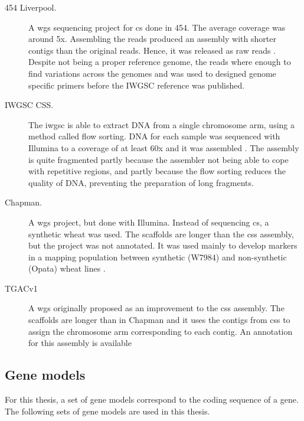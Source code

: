\begin{description}
\item[454 Liverpool.] A \gls{wgs} sequencing project for \gls{cs} done in 454. The average coverage was around 5x. Assembling the reads produced an assembly with shorter contigs than the original reads. Hence, it was released as raw reads \citep{Brenchley2012}. Despite not being a proper reference genome, the reads where enough to find variations across the genomes and was used to designed genome specific primers before the IWGSC reference was published. 
\item[IWGSC CSS.] The \gls{iwgsc} is able to extract DNA from a single chromosome arm, using a method called flow sorting. DNA for each sample was sequenced with Illumina to a coverage of at least 60x and it was assembled \citep{Mayer2014}. The assembly is quite fragmented partly because the assembler not being able to cope with repetitive regions, and partly because the flow sorting reduces the quality of DNA, preventing the preparation of long fragments. 
\item[Chapman.] A \gls{wgs} project, but done with Illumina. Instead of sequencing \gls{cs}, a synthetic wheat was used. The scaffolds are longer than the \gls{css} assembly, but the project was not annotated. It was used mainly to develop markers in a mapping population between synthetic (W7984) and non-synthetic (Opata) wheat lines \citep{Chapman2015}.   
\item[TGACv1] A \gls{wgs} originally proposed as an improvement to the \gls{css} assembly. The scaffolds are longer than in Chapman and it uses the contigs from \gls{css} to assign the chromosome arm corresponding to each contig. An annotation for this assembly is available \citep{Clark2016}
\end{description}


\subsection{Gene models}

For this thesis, a set of gene models correspond to the coding sequence of a gene. 
The following sets of gene models are used in this thesis. 


